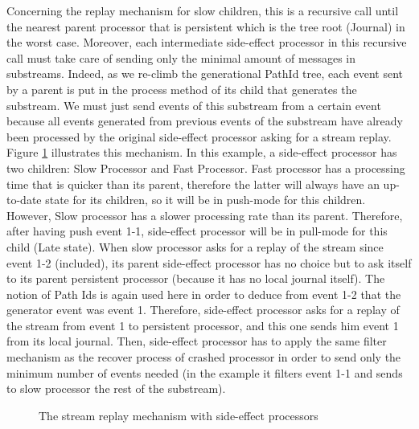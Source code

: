 Concerning the replay mechanism for slow children, this is a recursive call until the nearest parent processor that is persistent which is the tree root (Journal) in the worst case. 
Moreover, each intermediate side-effect processor in this recursive call must take care of sending only the minimal amount of messages in substreams. Indeed,
as we re-climb the generational PathId tree, each event sent by a parent is put in the process method of its child that generates the substream. We must just send
events of this substream from a certain event because all events generated from previous events of the substream have already been processed by the original side-effect processor asking for a stream replay. 
Figure \ref{fig:sideeffectreclimb} illustrates this mechanism. In this example, a side-effect processor has two children: Slow Processor and Fast Processor. Fast processor has a processing time that is quicker than its parent, therefore the latter will always have an up-to-date state for its children, so it will be in push-mode for this children. However,
Slow processor has a slower processing rate than its parent. Therefore, after having push event 1-1, side-effect processor will be in pull-mode for this child (Late state). When slow processor asks for a replay of the stream since event 1-2 (included), its parent side-effect processor has no choice but to ask itself to its parent persistent processor (because it has no local journal itself). The notion of Path Ids is again used here in order to deduce from event 1-2 that the generator event was event 1. Therefore, side-effect processor asks for a replay of the stream from event 1 to persistent processor, and this one sends him event 1 from its local journal. Then, side-effect processor has to apply the same filter mechanism as the recover process of crashed processor in order to send only the minimum number of events needed (in the example it filters event 1-1 and sends to slow processor the rest of the substream).

\begin{figure}[h]
  \begin{center} 
    \caption{The stream replay mechanism with side-effect processors}
    \label{fig:sideeffectreclimb}
  \end{center}
\end{figure}

